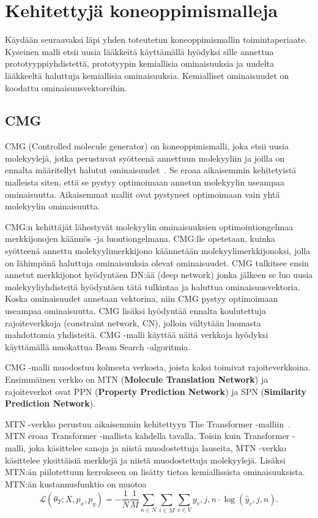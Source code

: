 \documentclass[finnish,twoside,censored,tkt,sw-line]{HYthesisML}
\begin{document}
\section{Kehitettyjä koneoppimismalleja}

Käydään seuraavaksi läpi yhden toteutetun koneoppimismallin toimintaperiaate.
Kyseinen malli etsii uusia lääkkeitä käyttämällä hyödyksi sille annettua prototyyppiyhdistettä, prototyypin kemiallisia ominaisuuksia ja uudelta lääkkeeltä haluttuja kemiallisia ominaisuuksia.
Kemialliset ominaisuudet on koodattu ominaisuusvektoreihin.

\subsection{CMG}

CMG (Controlled molecule generator) on koneoppimismalli, joka etsii uusia molekyylejä, jotka perustuvat syötteenä annettuun molekyyliin ja joilla on ennalta määritellyt halutut ominaisuudet~\cite{ShinBonggun}.
Se eroaa aikaisemmin kehitetyistä malleista siten, että se pystyy optimoimaan annetun molekyylin useampaa ominaisuutta.
Aikaisemmat mallit ovat pystyneet optimoimaan vain yhtä molekyylin ominaisuutta.

CMG:n kehittäjät lähestyvät molekyylin ominaisuuksien optimointiongelmaa merkkijonojen käännös -ja luontiongelmana.
CMG:lle opetetaan, kuinka syötteenä annettu molekyylimerkkijono käännetään molekyylimerkkijonoksi, jolla on lähimpänä haluttuja ominaisuuksia olevat ominaisuudet.
CMG tulkitsee ensin annetut merkkijonot hyödyntäen DN:ää (deep network) jonka jälkeen se luo uusia molekyyliyhdisteitä hyödyntäen tätä tulkintaa ja haluttua ominaisuusvektoria.
Koska ominaisuudet annetaan vektorina, niin CMG pystyy optimoimaan useampaa ominaisuutta.
CMG lisäksi hyödyntää ennalta koulutettuja rajoiteverkkoja (constraint network, CN), jolloin vältytään luomasta mahdottomia yhdisteitä.
CMG -malli käyttää näitä verkkoja hyödyksi käyttämällä muokattua Beam Search -algoritmia.


CMG -malli muodostuu kolmesta verkosta, joista kaksi toimivat rajoiteverkkoina.
Ensimmäinen verkko on MTN (\textbf{Molecule Translation Network}) ja rajoiteverkot ovat PPN (\textbf{Property Prediction Network}) ja SPN (\textbf{Similarity Prediction Network}).

MTN -verkko perustuu aikaisemmin kehitettyyn  The Transformer -malliin~\cite{TheTransformer}.
MTN eroaa Transformer -mallista kahdella tavalla.
Toisin kuin Transformer -malli, joka käsittelee sanoja ja niistä muodostettuja lauseita, MTN -verkko käsittelee yksittäisiä merkkejä ja niistä muodostettuja molekyylejä.
Lisäksi MTN:än piilotettuun kerrokseen on lisätty tietoa kemiallissista ominaisuuksista.
MTN:än kustannusfunktio on muotoa \[\mathcal{L} (\theta_T;X,p_x,p_y) = -\frac{1}{N}\frac{1}{M}\sum_{n \in N}\sum_{i \in M}\sum_{v \in V}y_v,j,n \cdot \log(\hat{y}_v,j,n).\]
\end{document}

